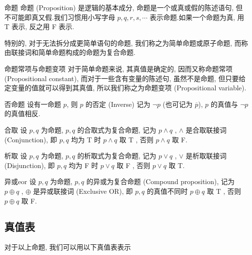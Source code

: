 \documentclass[cn,toc=twocol]{elegantbook}
\begin{document}
\begin{definition}{命题}
	命题 (Proposition) 是逻辑的基本成分, 命题是一个或真或假的陈述语句, 但不可能即真又假.我们习惯用小写字母 $p, q, r, s, \cdots$ 表示命题.如果一个命题为真, 用 T 表示, 反之用 F 表示.
	
	特别的, 对于无法拆分成更简单语句的命题, 我们称之为简单命题或原子命题, 而称由联接词和简单命题构成的命题为复合命题.
\end{definition}


\begin{definition}{命题常项与命题变项}
对于简单命题来说, 其真值是确定的, 因而又称命题常项 (Propositional constant), 而对于一些含有变量的陈述句, 虽然不是命题, 但只要给定变量的值就可以得到其真值, 所以我们称之为命题变项 (Propositional variable).
\end{definition}

\begin{definition}{否命题}
	设有一命题 $p$, 则 $p$ 的否定 (Inverse) 记为 $\neg p$ (也可记为 $\overline p$),  $p$ 的真值与 $\neg p$ 的真值相反.
\end{definition}


\begin{definition}{合取}
设 $p, q$ 为命题,  $p, q$ 的合取式为复合命题, 记为 $p\land q$ , $\land$ 是合取联接词 (Conjunction), 即 $p, q$ 均为 T 时 $p\land q$ 取 T , 否则 $p\land q$ 取 F.
\end{definition}

\begin{definition}{析取}
设 $p, q$ 为命题,  $p, q$ 的析取式为复合命题, 记为 $p\lor q$ , $\lor$ 是析取联接词 (Disjunction), 即 $p, q$ 均为 F 时 $p\lor q$ 取 F , 否则 $p\lor q$ 取 T.
\end{definition}

\begin{definition}{异或}{eor}
设 $p, q$ 为命题, $p, q$ 的异或为复合命题 (Compound proposition), 记为 $p\oplus q$ , $\oplus$ 是异或联接词 (Exclusive OR), 即 $p, q$ 的真值不同时 $p\oplus q$ 取 T , 否则 $p\oplus q$ 取 F.
\end{definition}

\subsection{真值表}
对于以上命题, 我们可以用以下真值表表示
\smallskip
\end{document}
